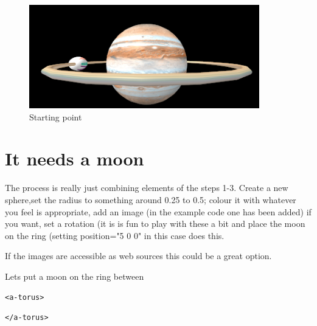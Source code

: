 \begin{figure}
    \centering
    \includegraphics[width=10cm]{chapters/chapter2/figures/Picture1.png}
    \caption{Starting point}
    \label{fig:Picture1}
\end{figure}


\section{It needs a moon}
The process is really just combining elements of the steps 1-3. Create a new sphere,set the radius to something around 0.25 to 0.5; colour it with whatever you feel is appropriate, add an image (in the example code one has been added) if you want, set a rotation (it is is fun to play with these a bit and place the moon on the ring (setting position="5 0 0" in this case does this.

If the images are accessible as web sources this could be a great option.

Lets put a moon on the ring between
\begin{lstlisting}
<a-torus>
\end{lstlisting} 
\begin{lstlisting}
</a-torus>
\end{lstlisting} 


